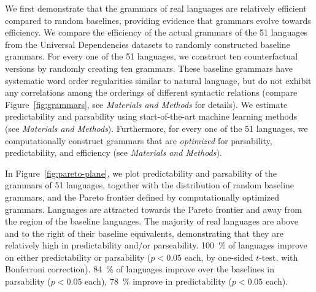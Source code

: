 \documentclass[9pt,twocolumn,twoside,lineno]{pnas-new}
\begin{document}
We first demonstrate that the grammars of real languages are relatively efficient compared to random baselines, providing evidence that grammars evolve towards efficiency.
We compare the efficiency of the actual grammars of the 51 languages from the Universal Dependencies datasets to randomly constructed baseline grammars.
For every one of the 51 languages, we construct ten counterfactual versions by randomly creating ten grammars.
These baseline grammars have systematic word order regularities similar to natural language, but do not exhibit any correlations among the orderings of different syntactic relations (compare Figure~\ref{fig:grammars}, see \textit{Materials and Methods} for details).
We estimate predictability and parsability using start-of-the-art machine learning methods (see \textit{Materials and Methods}).
Furthermore, for every one of the 51 languages, we computationally construct grammars that are \emph{optimized} for parsability, predictability, and efficiency (see \textit{Materials and Methods}).

In Figure~\ref{fig:pareto-plane}, we plot predictability and parsability of the grammars of 51 languages, together with the distribution of random baseline grammars, and the Pareto frontier defined by computationally optimized grammars.
Languages are attracted towards the Pareto frontier and away from the region of the baseline languages.
The majority of real languages are above and to the right of their baseline equivalents, demonstrating that they are relatively high in predictability and/or parseability.
100~\% of languages improve on either predictability or parsability ($p<0.05$ each, by one-sided $t$-test, with Bonferroni correction).
84~\% of languages improve over the baselines in parsability ($p < 0.05$ each), 78~\% improve in predictability ($p < 0.05$ each).




\end{document}
